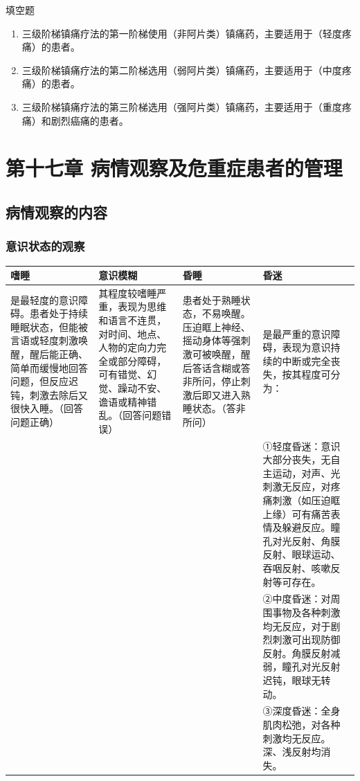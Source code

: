 \documentclass[11pt, a4paper]{ctexart}
\begin{document}
\begin{tipsbox}{填空题}
\begin{enumerate}
    \item 三级阶梯镇痛疗法的第一阶梯使用（非阿片类）镇痛药，主要适用于（轻度疼痛）的患者。
    \item 三级阶梯镇痛疗法的第二阶梯选用（弱阿片类）镇痛药，主要适用于（中度疼痛）的患者。
    \item 三级阶梯镇痛疗法的第三阶梯选用（强阿片类）镇痛药，主要适用于（重度疼痛）和剧烈癌痛的患者。
\end{enumerate}
\end{tipsbox}

\section{第十七章 病情观察及危重症患者的管理}
\subsection{病情观察的内容}
\subsubsection{意识状态的观察}
\begin{table}[htbp]
\centering
\begin{tabular}{|p{2.5cm}|p{3cm}|p{3cm}|p{6cm}|}
\hline
\textbf{嗜睡} & \textbf{意识模糊} & \textbf{昏睡} & \textbf{昏迷} \\
\hline
是最轻度的意识障碍。患者处于持续睡眠状态，但能被言语或轻度刺激唤醒，醒后能正确、简单而缓慢地回答问题，但反应迟钝，刺激去除后又很快入睡。（回答问题正确） & 其程度较嗜睡严重，表现为思维和语言不连贯，对时间、地点、人物的定向力完全或部分障碍，可有错觉、幻觉、躁动不安、谵语或精神错乱。（回答问题错误） & 患者处于熟睡状态，不易唤醒。压迫眶上神经、摇动身体等强刺激可被唤醒，醒后答话含糊或答非所问，停止刺激后即又进入熟睡状态。（答非所问） & 是最严重的意识障碍，表现为意识持续的中断或完全丧失，按其程度可分为：\\
& & & ①轻度昏迷：意识大部分丧失，无自主运动，对声、光刺激无反应，对疼痛刺激（如压迫眶上缘）可有痛苦表情及躲避反应。瞳孔对光反射、角膜反射、眼球运动、吞咽反射、咳嗽反射等可存在。\\
& & & ②中度昏迷：对周围事物及各种刺激均无反应，对于剧烈刺激可出现防御反射。角膜反射减弱，瞳孔对光反射迟钝，眼球无转动。\\
& & & ③深度昏迷：全身肌肉松弛，对各种刺激均无反应。深、浅反射均消失。\\
\hline
\end{tabular}
\end{table}
\end{document}
